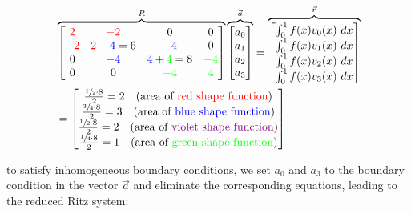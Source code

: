 \begin{align*}
    & \overbrace{
        \begin{bmatrix}
            {\color{red}2} & {\color{red}-2} & 0 & 0 \\
            {\color{red}-2} & {\color{red}2} + {\color{blue}4} = 6 & {\color{blue}-4} & 0 \\
            0 & {\color{blue}-4} & {\color{blue}4} + {\color{green}4} = 8 & {\color{green}-4} \\
            0 & 0 & {\color{green}-4} & {\color{green}4}
        \end{bmatrix}
    }^R
    \overbrace{
        \begin{bmatrix}
            a_0 \\
            a_1 \\
            a_2 \\
            a_3
        \end{bmatrix}
    }^{\vec{a}}
    =
    \overbrace{
        \begin{bmatrix}
            \int_0^1 f(x)v_0(x)\ dx \\
            \int_0^1 f(x)v_1(x)\ dx \\
            \int_0^1 f(x)v_2(x)\ dx \\
            \int_0^1 f(x)v_3(x)\ dx
        \end{bmatrix}
    }^{\vec{r}} \\
    & = 
    \begin{bmatrix}
        \frac{\sfrac{1}{2}\cdot 8}{2} = 2\quad\text{(area of {\color{red} red shape function})} \\
        \frac{\sfrac{3}{4}\cdot 8}{2} = 3\quad\text{(area of {\color{blue} blue shape function})} \\
        \frac{\sfrac{1}{2}\cdot 8}{2} = 2\quad\text{(area of {\color{violet} violet shape function})} \\
        \frac{\sfrac{1}{4}\cdot 8}{2} = 1\quad\text{(area of {\color{green} green shape function})} \\
    \end{bmatrix}
\end{align*}

to satisfy inhomogeneous boundary conditions, we set $a_0$ and $a_3$ to the boundary condition in the vector $\vec{a}$ and
eliminate the corresponding equations, leading to the reduced Ritz system:

